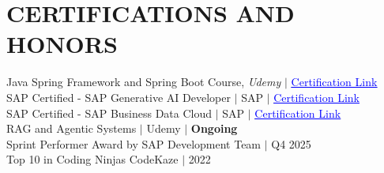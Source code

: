 \documentclass[a4paper,11pt]{article}
\begin{document}
\section{CERTIFICATIONS AND HONORS}
\begin{itemize}[leftmargin=0in, label={}]
  \small{\item{
    Java Spring Framework and Spring Boot Course, \textit{Udemy} $|$
    \href{https://drive.google.com/file/d/15Y_vlXhcvLmf3lc3POhsCfqhXIZ-PFnW/view?usp=drivesdk}{\textcolor{blue}{\underline{Certification Link}}} \vspace{2pt} \\
    SAP Certified - SAP Generative AI Developer $|$ SAP $|$
    \href{https://drive.google.com/file/d/1uqNKE2333en0DDXJJANov45yeBwHCy5_/view} {\textcolor{blue}{\underline{Certification Link}}} \vspace{2pt} \\
    SAP Certified - SAP Business Data Cloud $|$ SAP $|$
    \href{https://drive.google.com/file/d/1n8qdoP86aJObm5_9nm-E8dtE3wyYF31d/view} {\textcolor{blue}{\underline{Certification Link}}} \vspace{2pt} \\
    RAG and Agentic Systems $|$ Udemy $|$ \textbf{Ongoing}\vspace{2pt} \\
    Sprint Performer Award by SAP Development Team $|$ Q4 2025\vspace{2pt}\\
    Top 10 in Coding Ninjas CodeKaze $|$ 2022\\
  }}
\end{itemize}

\end{document}

